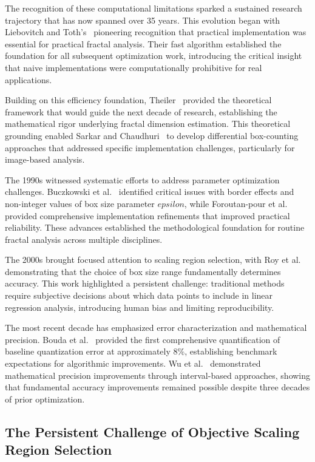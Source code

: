 \documentclass[preprint,12pt]{elsarticle}
\def\epsilon{epsilon}%
\begin{document}
The recognition of these computational limitations sparked a sustained research trajectory that has now spanned over 35 years. This evolution began with Liebovitch and Toth's~\cite{liebovitch1989} pioneering recognition that practical implementation was essential for practical fractal analysis. Their fast algorithm established the foundation for all subsequent optimization work, introducing the critical insight that naive implementations were computationally prohibitive for real applications.

Building on this efficiency foundation, Theiler~\cite{theiler1990} provided the theoretical framework that would guide the next decade of research, establishing the mathematical rigor underlying fractal dimension estimation. This theoretical grounding enabled Sarkar and Chaudhuri~\cite{sarkar1994} to develop differential box-counting approaches that addressed specific implementation challenges, particularly for image-based analysis.

The 1990s witnessed systematic efforts to address parameter optimization challenges. Buczkowski et al.~\cite{buczkowski1998} identified critical issues with border effects and non-integer values of box size parameter $\epsilon$, while Foroutan-pour et al.~\cite{foroutan1999} provided comprehensive implementation refinements that improved practical reliability. These advances established the methodological foundation for routine fractal analysis across multiple disciplines.

The 2000s brought focused attention to scaling region selection, with Roy et al.~\cite{roy2007} demonstrating that the choice of box size range fundamentally determines accuracy. This work highlighted a persistent challenge: traditional methods require subjective decisions about which data points to include in linear regression analysis, introducing human bias and limiting reproducibility.

The most recent decade has emphasized error characterization and mathematical precision. Bouda et al.~\cite{bouda2016} provided the first comprehensive quantification of baseline quantization error at approximately 8\%, establishing benchmark expectations for algorithmic improvements. Wu et al.~\cite{wu2020} demonstrated mathematical precision improvements through interval-based approaches, showing that fundamental accuracy improvements remained possible despite three decades of prior optimization.

\subsection{The Persistent Challenge of Objective Scaling Region Selection}
\end{document}
